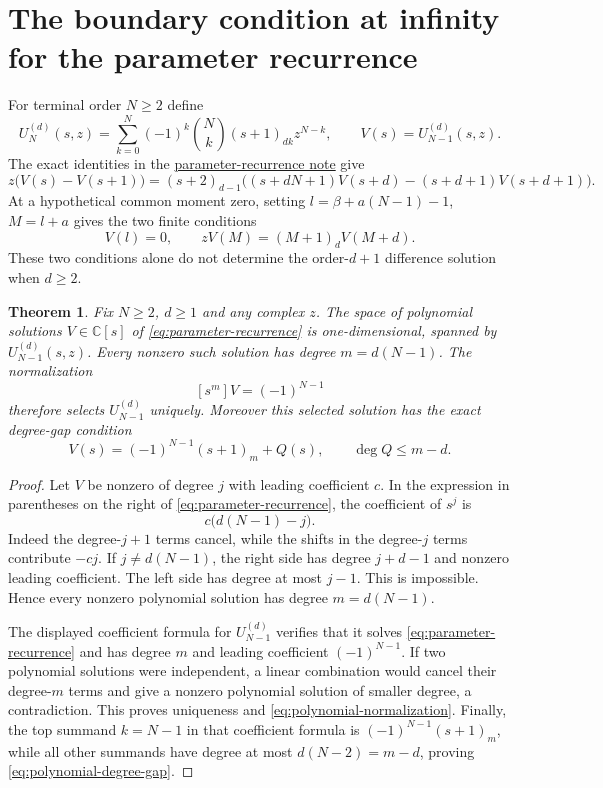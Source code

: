 \documentclass[11pt]{article}
\newtheorem{theorem}{Theorem}
\begin{document}
\section{The boundary condition at infinity for the parameter recurrence}
For terminal order $N\ge2$ define
\[
 U_N^{(d)}(s,z)=\sum_{k=0}^N(-1)^k\binom Nk(s+1)_{dk}z^{N-k},
 \qquad V(s)=U_{N-1}^{(d)}(s,z).
\]
The exact identities in the
\href{UNIFORM_PADE_PARABOLA_SFC.tex}{parameter-recurrence note}
give
\[
 z\bigl(V(s)-V(s+1)\bigr)
 =(s+2)_{d-1}\bigl((s+dN+1)V(s+d)
                    -(s+d+1)V(s+d+1)\bigr).              \tag{10}\label{eq:parameter-recurrence}
\]
At a hypothetical common moment zero, setting
$l=\beta+a(N-1)-1$, $M=l+a$ gives the two finite conditions
\[
 V(l)=0,\qquad zV(M)=(M+1)_dV(M+d).                        \tag{11}\label{eq:finite-boundaries}
\]
These two conditions alone do not determine the order-$d+1$ difference
solution when $d\ge2$.

\begin{theorem}\label{thm:polynomial}
Fix $N\ge2$, $d\ge1$ and any complex $z$. The space of polynomial
solutions $V\in\mathbb C[s]$ of \eqref{eq:parameter-recurrence} is one-dimensional, spanned by
$U_{N-1}^{(d)}(s,z)$. Every nonzero such solution has degree
$m=d(N-1)$. The normalization
\[
 [s^m]V=(-1)^{N-1}                                       \tag{12}\label{eq:polynomial-normalization}
\]
therefore selects $U_{N-1}^{(d)}$ uniquely.
Moreover this selected solution has the exact degree-gap condition
\[
 V(s)=(-1)^{N-1}(s+1)_m+Q(s),
 \qquad \deg Q\le m-d.                                   \tag{13}\label{eq:polynomial-degree-gap}
\]
\end{theorem}
\begin{proof}
Let $V$ be nonzero of degree $j$ with leading coefficient $c$.
In the expression in parentheses on the right of \eqref{eq:parameter-recurrence}, the coefficient
of $s^j$ is
\[
 c\bigl(d(N-1)-j\bigr).
\]
Indeed the degree-$j+1$ terms cancel, while the shifts in the
degree-$j$ terms contribute $-cj$.
If $j\ne d(N-1)$, the right side has degree $j+d-1$ and nonzero
leading coefficient. The left side has degree at most $j-1$.
This is impossible. Hence every nonzero polynomial solution has
degree $m=d(N-1)$.

The displayed coefficient formula for $U_{N-1}^{(d)}$ verifies that
it solves \eqref{eq:parameter-recurrence} and has degree $m$ and leading coefficient
$(-1)^{N-1}$. If two polynomial solutions were independent,
a linear combination would cancel their degree-$m$ terms and give
a nonzero polynomial solution of smaller degree, a contradiction.
This proves uniqueness and \eqref{eq:polynomial-normalization}. Finally, the top summand $k=N-1$
in that coefficient formula is $(-1)^{N-1}(s+1)_m$, while all other
summands have degree at most $d(N-2)=m-d$, proving \eqref{eq:polynomial-degree-gap}.
\end{proof}
\end{document}
